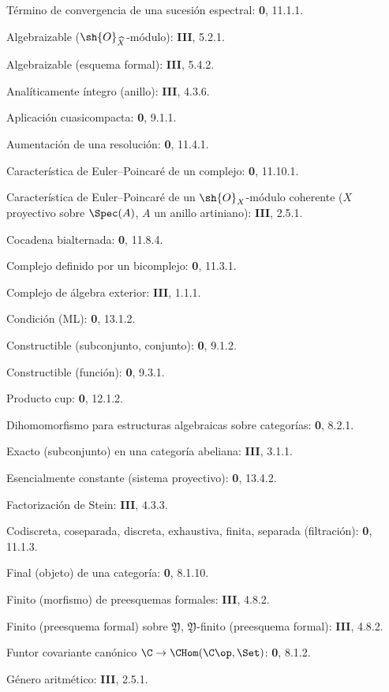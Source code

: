 \documentclass[oneside]{amsart}
\makeatletter
\newcommand{\ega@arrow}[2]{\mathchoice{#1}{#2}{#2}{#2}}
\renewcommand{\to}{\ega@arrow{\longrightarrow}{\rightarrow}}
\makeatother
\begin{document}
\begin{flushleft}
Término de convergencia de una sucesión espectral: \textbf 0, 11.1.1.

Algebraizable ($\sh{O}_{\widehat X}$-módulo): \textbf{III}, 5.2.1.

Algebraizable (esquema formal): \textbf{III}, 5.4.2.

Analíticamente íntegro (anillo): \textbf{III}, 4.3.6.

Aplicación cuasicompacta: \textbf 0, 9.1.1.

Aumentación de una resolución: \textbf 0, 11.4.1.

Característica de Euler--Poincaré de un complejo: \textbf 0, 11.10.1.

Característica de Euler--Poincaré de un $\sh{O}_X$-módulo coherente
($X$ proyectivo sobre $\Spec(A)$, $A$ un anillo artiniano): \textbf{III}, 2.5.1.

Cocadena bialternada: \textbf 0, 11.8.4.

Complejo definido por un bicomplejo: \textbf 0, 11.3.1.

Complejo de álgebra exterior: \textbf{III}, 1.1.1.

Condición (ML): \textbf 0, 13.1.2.

Constructible (subconjunto, conjunto): \textbf 0, 9.1.2.

Constructible (función): \textbf 0, 9.3.1.

Producto cup: \textbf 0, 12.1.2.

Dihomomorfismo para estructuras algebraicas sobre categorías: \textbf 0, 8.2.1.

Exacto (subconjunto) en una categoría abeliana: \textbf{III}, 3.1.1.

Esencialmente constante (sistema proyectivo): \textbf 0, 13.4.2.

Factorización de Stein: \textbf{III}, 4.3.3.

Codiscreta, coseparada, discreta, exhaustiva, finita, separada
(filtración): \textbf 0, 11.1.3.

Final (objeto) de una categoría: \textbf 0, 8.1.10.

Finito (morfismo) de preesquemas formales: \textbf{III}, 4.8.2.

Finito (preesquema formal) sobre $\mathfrak Y$,
$\mathfrak Y$-finito (preesquema formal): \textbf{III}, 4.8.2.

Funtor covariante canónico $\C\to\CHom(\C\op,\Set)$: \textbf 0, 8.1.2.

Género aritmético: \textbf{III}, 2.5.1.


\end{flushleft}
\end{document}
